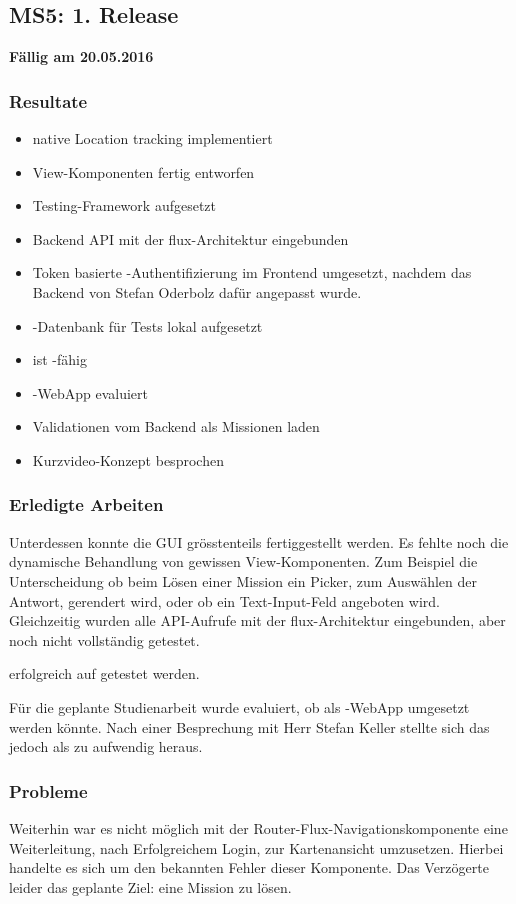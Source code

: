 \subsection{MS5: 1. Release}
\label{pm-ms5}
\textbf{Fällig am 20.05.2016}
\subsubsection{Resultate}
\begin{itemize}
	\item native Location tracking implementiert
	\item View-Komponenten fertig entworfen
	\item Testing-\gls{Framework} aufgesetzt
	\item Backend API mit der flux-Architektur eingebunden
	\item Token basierte -Authentifizierung im Frontend umgesetzt, nachdem das Backend von Stefan Oderbolz dafür angepasst wurde.
	\item \kort{}-Datenbank für Tests lokal aufgesetzt
	\item \kort{} ist -fähig
	\item {}-\gls{WebApp} evaluiert
	\item Validationen vom Backend als Missionen laden
	\item Kurzvideo-Konzept besprochen
\end{itemize}

\subsubsection{Erledigte Arbeiten}
Unterdessen konnte die GUI grösstenteils fertiggestellt werden. 
Es fehlte noch die dynamische Behandlung von gewissen View-Komponenten.
Zum Beispiel die Unterscheidung ob beim Lösen einer Mission ein Picker, zum Auswählen der Antwort, gerendert wird, oder ob ein Text-Input-Feld angeboten wird.
Gleichzeitig wurden alle API-Aufrufe mit der flux-Architektur eingebunden, aber noch nicht vollständig getestet.

\kort{} erfolgreich auf  getestet werden.

Für die geplante Studienarbeit wurde evaluiert, ob \kort{} als -\gls{WebApp} umgesetzt werden könnte. 
Nach einer Besprechung mit Herr Stefan Keller stellte sich das jedoch als zu aufwendig heraus. 

\subsubsection{Probleme}
Weiterhin war es nicht möglich mit der Router-Flux-Navigationskomponente eine Weiterleitung, nach Erfolgreichem Login, zur Kartenansicht umzusetzen.
Hierbei handelte es sich um den bekannten Fehler dieser Komponente.
Das Verzögerte leider das geplante Ziel: eine Mission zu lösen.


